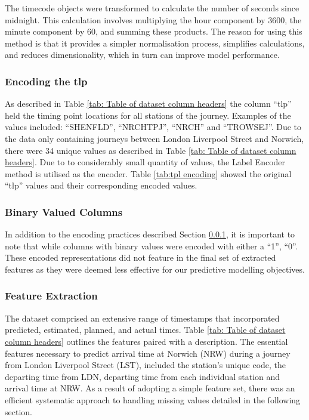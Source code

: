 \noindent
The timecode objects were transformed to calculate the number of seconds since midnight. This calculation involves multiplying the hour component by 3600, the minute component by 60, and summing these products. The reason for using this method is that it provides a simpler normalisation process, simplifies calculations, and reduces dimensionality, which in turn can improve model performance. 

\subsubsection{Encoding the tlp}\label{sec: Encoding the tlp}
As described in Table \ref{tab: Table of dataset column headers} the column ``tlp'' held the timing point locations for all stations of the journey. Examples of the values included: ``SHENFLD'', ``NRCHTPJ'', ``NRCH'' and ``TROWSEJ''. Due to the data only containing journeys between London Liverpool Street and Norwich, there were 34 unique values as described in Table \ref{tab: Table of dataset column headers}. Due to to considerably small quantity of values, the Label Encoder method is utilised as the encoder. Table \ref{tab:tpl encoding} showed the original ``tlp'' values and their corresponding encoded values.

\subsubsection{Binary Valued Columns}
In addition to the encoding practices described Section \ref{sec: Encoding the tlp}, it is important to note that while columns with binary values were encoded with either a ``1'', ``0''. These encoded representations did not feature in the final set of extracted features as they were deemed less effective for our predictive modelling objectives.

\subsubsection{Feature Extraction}
The dataset comprised an extensive range of timestamps that incorporated predicted, estimated, planned, and actual times. Table \ref{tab: Table of dataset column headers} outlines the features paired with a description. The essential features necessary to predict arrival time at Norwich (NRW) during a journey from London Liverpool Street (LST), included the station's unique code, the departing time from LDN, departing time from each individual station and arrival time at NRW. As a result of adopting a simple feature set, there was an efficient systematic approach to handling missing values detailed in the following section.


